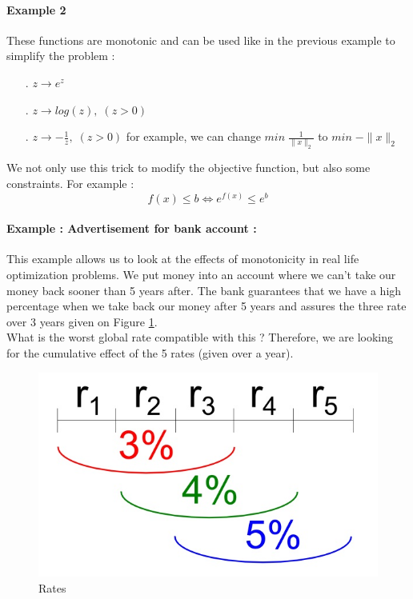 \paragraph{Example 2}
These functions are monotonic and can be used like in the previous example to simplify the problem :
\begin{itemize}
\item[.]{$z \rightarrow e^z$}
\item[.]{$z \rightarrow log(z), \; (z>0)$}
\item[.]{$z \rightarrow -\frac{1}{z}, \; (z>0)$ for example, we can change $min \; \frac{1}{\|x\|_{2}}$ to $min \; -\|x\|_{2}$}\\
\end{itemize}

We not only use this trick to modify the objective function, but also some constraints. For example : 
$$f(x) \leq b \Leftrightarrow e^{f(x)} \leq e^{b}$$

\paragraph{Example  : Advertisement for bank account :}
This example allows us to look at the effects of monotonicity in real life optimization problems.
We put money into an account where we can't take our money back sooner than 5 years after. The bank guarantees that we have a high percentage when we take back our money after 5 years and assures the three rate over 3 years given on Figure \ref{ra}.\\ What is the worst global rate compatible with this ? Therefore, we are looking for the cumulative effect of the 5 rates (given over a year). 

\begin{figure}
\centering
\includegraphics[scale=0.3]{./images/Course3_rate.jpg}
\caption{Rates}
\label{ra}
\end{figure}

